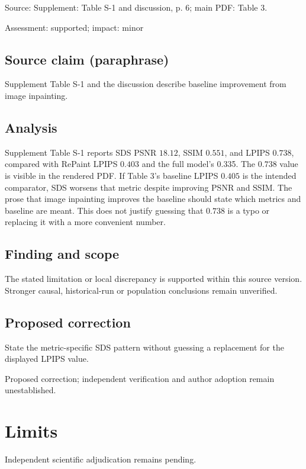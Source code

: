 \documentclass[11pt]{article}
\begin{document}
Source: Supplement: Table S-1 and discussion, p. 6; main PDF: Table 3.

Assessment: supported; impact: minor

\subsection*{Source claim (paraphrase)}

Supplement Table S-1 and the discussion describe baseline improvement from image inpainting.

\subsection*{Analysis}

Supplement Table S-1 reports SDS PSNR \(18.12\), SSIM \(0.551\), and LPIPS \(0.738\), compared with RePaint LPIPS \(0.403\) and the full model's 0.335. The \(0.738\) value is visible in the rendered PDF. If Table 3's baseline LPIPS \(0.405\) is the intended comparator, SDS worsens that metric despite improving PSNR and SSIM. The prose that image inpainting improves the baseline should state which metrics and baseline are meant. This does not justify guessing that \(0.738\) is a typo or replacing it with a more convenient number.

\subsection*{Finding and scope}

The stated limitation or local discrepancy is supported within this source version. Stronger causal, historical-run or population conclusions remain unverified.

\subsection*{Proposed correction}

State the metric-specific SDS pattern without guessing a replacement for the displayed LPIPS value.

Proposed correction; independent verification and author adoption remain unestablished.

\section*{Limits}

Independent scientific adjudication remains pending.\par
\end{document}
